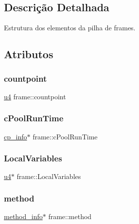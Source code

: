 \subsection{Descrição Detalhada}
Estrutura dos elementos da pilha de frames. 

\subsection{Atributos}
\mbox{\label{structframe_aa4ce8c8307208f3fdf27b5a81fc265af}} 
\subsubsection{\texorpdfstring{countpoint}{countpoint}}
{\footnotesize\ttfamily \hyperlink{ClassLoader_8h_aedf6ddc03df8caaaccbb4c60b9a9b850}{u4} frame\+::countpoint}

\mbox{\label{structframe_af9ce330bb6f6e4d7b2a5fb046f08e4dc}} 
\subsubsection{\texorpdfstring{c\+Pool\+Run\+Time}{cPoolRunTime}}
{\footnotesize\ttfamily \hyperlink{structcp__info}{cp\+\_\+info}$\ast$ frame\+::c\+Pool\+Run\+Time}

\mbox{\label{structframe_a1c91e0ecde5fe1fee5bf295f096b511f}} 
\subsubsection{\texorpdfstring{Local\+Variables}{LocalVariables}}
{\footnotesize\ttfamily \hyperlink{ClassLoader_8h_aedf6ddc03df8caaaccbb4c60b9a9b850}{u4}$\ast$ frame\+::\+Local\+Variables}

\mbox{\label{structframe_a2fac8190b89a1cf94c23628f1849a939}} 
\subsubsection{\texorpdfstring{method}{method}}
{\footnotesize\ttfamily \hyperlink{structmethod__info}{method\+\_\+info}$\ast$ frame\+::method}

